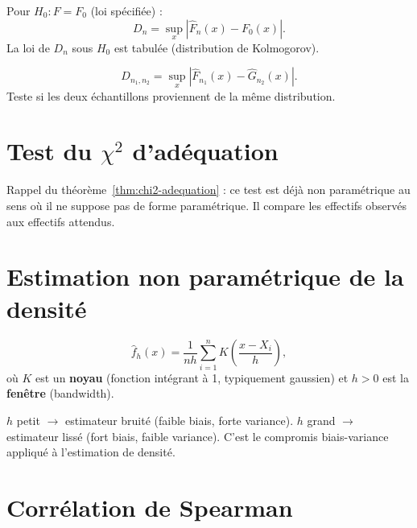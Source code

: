 \begin{definition}
Pour $H_0:F=F_0$ (loi sp\'ecifi\'ee) :
\[
D_n = \sup_{x}|\hat{F}_n(x)-F_0(x)|.
\]
La loi de $D_n$ sous $H_0$ est tabul\'ee (distribution de Kolmogorov).
\end{definition}

\begin{definition}
\[
D_{n_1,n_2} = \sup_x|\hat{F}_{n_1}(x)-\hat{G}_{n_2}(x)|.
\]
Teste si les deux \'echantillons proviennent de la m\^eme distribution.
\end{definition}

\section{Test du $\chi^2$ d'ad\'equation}

Rappel du th\'eor\`eme~\ref{thm:chi2-adequation} : ce test est d\'ej\`a non param\'etrique au sens o\`u il ne suppose pas de forme param\'etrique. Il compare les effectifs observ\'es aux effectifs attendus.

\section{Estimation non param\'etrique de la densit\'e}

\begin{definition}
\[
\hat{f}_h(x) = \frac{1}{nh}\sum_{i=1}^n K\!\left(\frac{x-X_i}{h}\right),
\]
o\`u $K$ est un \textbf{noyau} (fonction int\'egrant \`a 1, typiquement gaussien) et $h>0$ est la \textbf{fen\^etre} (bandwidth).
\end{definition}

\begin{intuition}
$h$ petit $\to$ estimateur bruit\'e (faible biais, forte variance). $h$ grand $\to$ estimateur liss\'e (fort biais, faible variance). C'est le compromis biais-variance appliqu\'e \`a l'estimation de densit\'e.
\end{intuition}

\section{Corr\'elation de Spearman}

